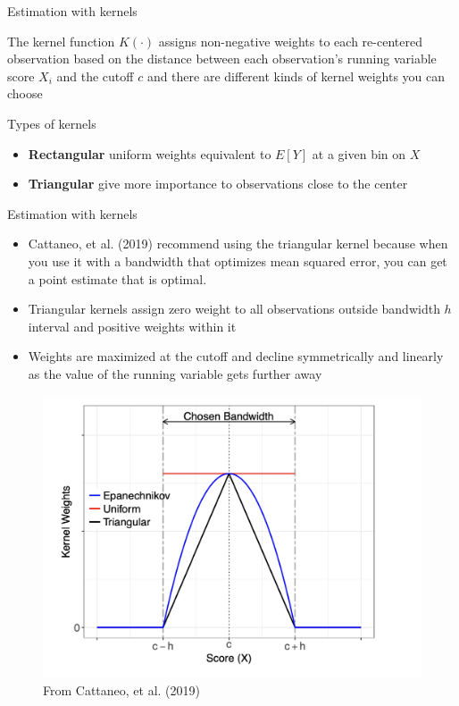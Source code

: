 \documentclass{beamer}
\begin{document}
\begin{frame}{Estimation with kernels}

The kernel function $K(\cdot)$ assigns non-negative weights to each re-centered observation based on the distance between each observation's running variable score $X_i$ and the cutoff $c$ and there are different kinds of kernel weights you can choose

\end{frame}

\begin{frame}{Types of kernels}

\begin{itemize}
	\item \textbf{Rectangular} uniform weights equivalent to $E[Y]$ at a given bin on $X$
	\item \textbf{Triangular} give more importance to observations close to the center
\end{itemize}
\end{frame}

\begin{frame}{Estimation with kernels}


\begin{itemize}
\item Cattaneo, et al. (2019) recommend using the triangular kernel because when you use it with a bandwidth that optimizes mean squared error, you can get a point estimate that is optimal. 
\item Triangular kernels assign zero weight to all observations outside bandwidth $h$ interval and positive weights within it
\item Weights are maximized at the cutoff and decline symmetrically and linearly as the value of the running variable gets further away
\end{itemize}

\end{frame}

\begin{frame}

		\begin{figure}
		\includegraphics[scale=0.4]{./lecture_includes/cattaneo_kernels}
		\caption{From Cattaneo, et al. (2019)}
		\end{figure}

\end{frame}
\end{document}
